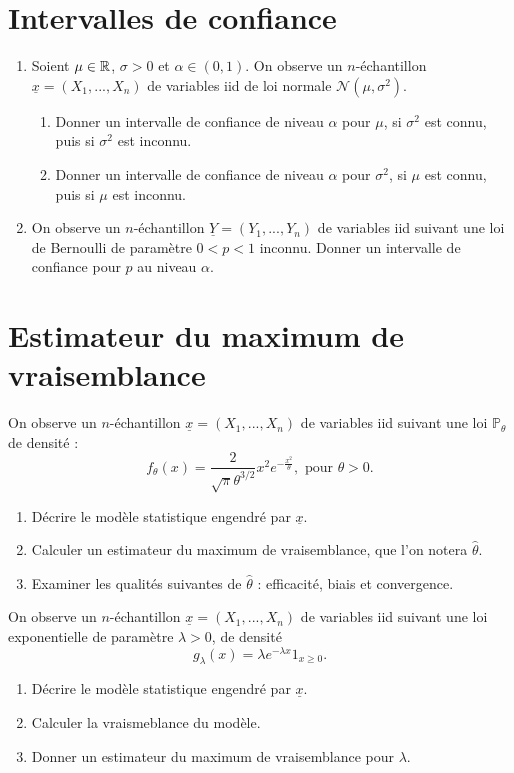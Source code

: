 \section{Intervalles de confiance}
\begin{enumerate}
\item 
Soient $\mu\in \mathbb R$, $\sigma>0$ et $\alpha\in (0,1)$.
On observe un $n$-échantillon $\underline x=(X_1,...,X_n)$ de variables iid de loi normale $\mathcal N(\mu ,\sigma^2)$.
\begin{enumerate}
\item Donner un intervalle de confiance de niveau $\alpha$ pour $\mu$, si $\sigma^2$ est connu, puis si $\sigma^2$ est inconnu.
\item Donner un intervalle de confiance de niveau $\alpha$ pour $\sigma^2$, si $\mu$ est connu, puis si $\mu$ est inconnu.
\end{enumerate}

\item On observe un $n$-échantillon $\underline Y=(Y_1,...,Y_n)$ de variables iid suivant une loi de Bernoulli de paramètre $0<p<1$ inconnu. Donner un intervalle de confiance pour $p$ au niveau $\alpha$.

\end{enumerate}

\section{Estimateur du maximum de vraisemblance}
On observe un $n$-échantillon $\underline x=(X_1,...,X_n)$ de variables iid suivant une loi $\mathbb{P}_\theta$ de densité :
\[f_\theta (x ) = \frac{2}{\sqrt{\pi}\theta^{3/2}}x^2 e^{-\frac{x^2}{\theta}}, \text{ pour }\theta >0. \]

\begin{enumerate}
\item  Décrire le modèle statistique engendré par $\underline x$.
\item Calculer un estimateur du maximum de vraisemblance, que l'on notera $\hat \theta$.
\item Examiner les qualités suivantes de $\hat \theta$ : efficacité, biais et convergence.
\end{enumerate}

On observe un $n$-échantillon $\underline x=(X_1,...,X_n)$ de variables iid suivant une loi exponentielle de paramètre $\lambda >0$, de densité
\[g_\lambda (x)=\lambda e^{-\lambda x}1_{x\geq 0}.\]
\begin{enumerate}
 \item Décrire le modèle statistique engendré par $\underline x$.
\item Calculer la vraismeblance du modèle.
\item Donner un estimateur du maximum de vraisemblance pour $\lambda$.
\end{enumerate}


